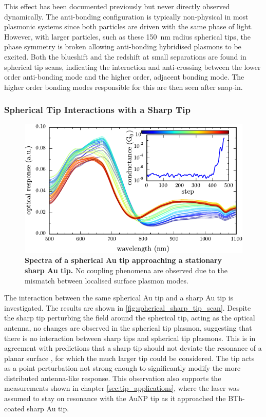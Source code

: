 \documentclass[a4paper]{article}
\begin{document}
This effect has been documented previously \cite{nordlander2004} but never directly observed dynamically. The anti-bonding configuration is typically non-physical in most plasmonic systems since both particles are driven with the same phase of light. However, with larger particles, such as these \SI{150}{nm} radius spherical tips, the phase symmetry is broken allowing anti-bonding hybridised plasmons to be excited. Both the blueshift and the redshift at small separations are found in spherical tip scans, indicating the interaction and anti-crossing between the lower order anti-bonding mode and the higher order, adjacent bonding mode. The higher order bonding modes responsible for this are then seen after snap-in.

\subsubsection{Spherical Tip Interactions with a Sharp Tip}

\begin{figure}[bt]
\centering
\includegraphics{figures/sharp-AuNP_tip_dimer}
\caption[Spectra of a spherical Au tip approaching a stationary sharp Au tip]{\textbf{Spectra of a spherical Au tip approaching a stationary sharp Au tip.} No coupling phenomena are observed due to the mismatch between localised surface plasmon modes.}
\label{fig:spherical_sharp_tip_scan}
\end{figure}

The interaction between the same spherical Au tip and a sharp Au tip is investigated. The results are shown in \autoref{fig:spherical_sharp_tip_scan}. Despite the sharp tip perturbing the field around the spherical tip, acting as the optical antenna, no changes are observed in the spherical tip plasmon, suggesting that there is no interaction between sharp tips and spherical tip plasmons. This is in agreement with predictions that a sharp tip should not deviate the resonance of a planar surface \cite{downes2006, hugall2012}, for which the much larger tip could be considered. The tip acts as a point perturbation not strong enough to significantly modify the more distributed antenna-like response.
This observation also supports the measurements shown in chapter \ref{sec:tip_applications}, where the laser was assumed to stay on resonance with the AuNP tip as it approached the BTh-coated sharp Au tip.
\end{document}
